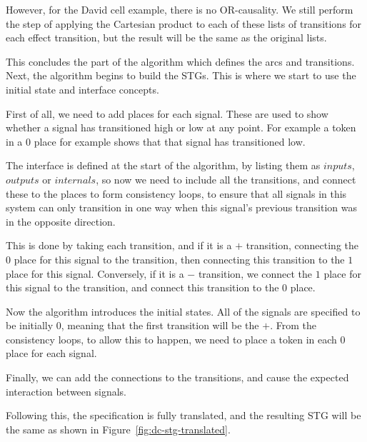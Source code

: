 \documentclass[british,conference,compsoc]{IEEEtran}
\begin{document}
However, for the David cell example, there is no OR-causality. We still perform
the step of applying the Cartesian product to each of these lists of transitions
for each effect transition, but the result will be the same as the original lists.

This concludes the part of the algorithm which defines the arcs
and transitions. Next, the algorithm begins to build the STGs. This is where
we start to use the initial state and interface concepts. 

First of all, we need to add places for each signal. These are used to
show whether a signal has transitioned high or low at any point. 
For example a token in a $0$ place for example shows that that signal has 
transitioned low. 

The interface is defined at the start of the algorithm, by listing them as 
$inputs$, $outputs$ or $internals$, so now we need to include all the 
transitions, and connect these to the places to form consistency loops, to 
ensure that all signals in this system can only transition in one way when this 
signal's previous transition was in the opposite direction. 

This is done by taking each transition, and if it is a $+$ transition, 
connecting the $0$ place for this signal to the transition, then connecting 
this transition to the $1$ place for this signal. Conversely, if it is a $-$ 
transition, we connect the $1$ place for this signal to the transition, and 
connect this transition to the $0$ place.

Now the algorithm introduces the initial states. All of the signals are 
specified to be initially 0, meaning that the first transition will be the $+$.
From the consistency loops, to allow this to happen, we need to place a token 
in each $0$ place for each signal.

Finally, we can add the connections to the transitions, and cause the 
expected interaction between signals. 


Following this, the specification is fully translated, and the resulting STG 
will be the same as shown in Figure~\ref{fig:dc-stg-translated}.
\end{document}
